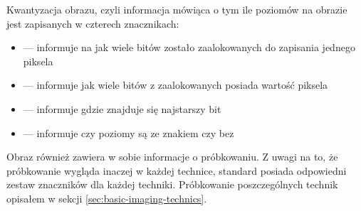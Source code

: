 \dicomRetired

\par
Kwantyzacja obrazu, czyli informacja mówiąca o tym ile poziomów na obrazie jest zapisanych w czterech znacznikach:
\begin{itemize}
    \item {} --- informuje na jak wiele bitów zostało zaalokowanych do zapisania jednego piksela
    \item {} --- informuje jak wiele bitów z zaalokowanych posiada wartość piksela
    \item {} --- informuje gdzie znajduje się najstarszy bit
    \item {} --- informuje czy poziomy są ze znakiem czy bez
\end{itemize}

\par
Obraz \DICOM również zawiera w sobie informacje o próbkowaniu.
Z uwagi na to, że próbkowanie wygląda inaczej w każdej technice, standard posiada odpowiedni zestaw znaczników dla każdej techniki.
Próbkowanie poszczególnych technik opisałem w sekcji \ref{sec:basic-imaging-technics}.







